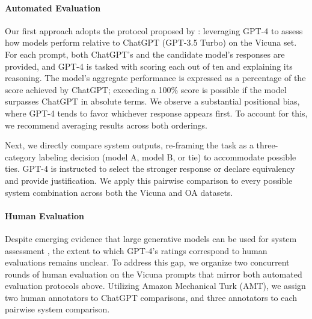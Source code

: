 \paragraph{Automated Evaluation} Our first approach adopts the protocol proposed by \citet{vicuna2023}: leveraging GPT-4 to assess how models perform relative to ChatGPT (GPT-3.5 Turbo) on the Vicuna set. For each prompt, both ChatGPT's and the candidate model’s responses are provided, and GPT-4 is tasked with scoring each out of ten and explaining its reasoning. The model's aggregate performance is expressed as a percentage of the score achieved by ChatGPT; exceeding a 100\% score is possible if the model surpasses ChatGPT in absolute terms. We observe a substantial positional bias, where GPT-4 tends to favor whichever response appears first. To account for this, we recommend averaging results across both orderings.

Next, we directly compare system outputs, re-framing the task as a three-category labeling decision (model A, model B, or tie) to accommodate possible ties. GPT-4 is instructed to select the stronger response or declare equivalency and provide justification. We apply this pairwise comparison to every possible system combination across both the Vicuna and OA datasets.

\paragraph{Human Evaluation} Despite emerging evidence that large generative models can be used for system assessment \citep{fu2023gptscore}, the extent to which GPT-4’s ratings correspond to human evaluations remains unclear. To address this gap, we organize two concurrent rounds of human evaluation on the Vicuna prompts that mirror both automated evaluation protocols above. Utilizing Amazon Mechanical Turk (AMT), we assign two human annotators to ChatGPT comparisons, and three annotators to each pairwise system comparison.

